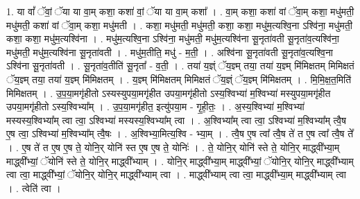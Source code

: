 \documentclass[17pt]{extarticle}
\begin{document}
1. या वां᳚ ॅवां॒ ॅया या वा॒म् कशा॒ कशा॑ वां॒ ॅया या वा॒म् कशा᳚ । . वा॒म् कशा॒ कशा॑ वां ॅवा॒म् कशा॒ मधु॑मती॒ मधु॑मती॒ कशा॑ वां ॅवा॒म् कशा॒ मधु॑मती । . कशा॒ मधु॑मती॒ मधु॑मती॒ कशा॒ कशा॒ मधु॑म॒त्यश्वि॒ना ऽश्वि॑ना॒ मधु॑मती॒ कशा॒ कशा॒ मधु॑म॒त्यश्वि॑ना । . मधु॑म॒त्यश्वि॒ना ऽश्वि॑ना॒ मधु॑मती॒ मधु॑म॒त्यश्वि॑ना सू॒नृता॑वती सू॒नृता॑व॒त्यश्वि॑ना॒ मधु॑मती॒ मधु॑म॒त्यश्वि॑ना सू॒नृता॑वती । . मधु॑म॒तीति॒ मधु॑ - म॒ती॒ । . अश्वि॑ना सू॒नृता॑वती सू॒नृता॑व॒त्यश्वि॒ना ऽश्वि॑ना सू॒नृता॑वती । . सू॒नृता॑व॒तीति॑ सू॒नृता᳚ - व॒ती॒ । . तया॑ य॒ज्ञ्ं ॅय॒ज्ञ्म् तया॒ तया॑ य॒ज्ञ्म् मि॑मिक्षतम् मिमिक्षतं ॅय॒ज्ञ्म् तया॒ तया॑ य॒ज्ञ्म् मि॑मिक्षतम् । . य॒ज्ञ्म् मि॑मिक्षतम् मिमिक्षतं ॅय॒ज्ञ्ं ॅय॒ज्ञ्म् मि॑मिक्षतम् । . मि॒मि॒क्ष॒त॒मिति॑ मिमिक्षतम् । . उ॒प॒या॒मगृ॑हीतो ऽस्यस्युपया॒मगृ॑हीत उपया॒मगृ॑हीतो ऽस्य॒श्विभ्या॑ म॒श्विभ्या॑ मस्युपया॒मगृ॑हीत उपया॒मगृ॑हीतो ऽस्य॒श्विभ्या᳚म् । . उ॒प॒या॒मगृ॑हीत॒ इत्यु॑पया॒म - गृ॒ही॒तः॒ । . अ॒स्य॒श्विभ्या॑ म॒श्विभ्या॑ मस्यस्य॒श्विभ्या᳚म् त्वा त्वा॒ ऽश्विभ्या॑ मस्यस्य॒श्विभ्या᳚म् त्वा । . अ॒श्विभ्या᳚म् त्वा त्वा॒ ऽश्विभ्या॑ म॒श्विभ्या᳚म् त्वै॒ष ए॒ष त्वा॒ ऽश्विभ्या॑ म॒श्विभ्या᳚म् त्वै॒षः । . अ॒श्विभ्या॒मित्य॒श्वि - भ्या॒म् । . त्वै॒ष ए॒ष त्वा᳚ त्वै॒ष ते॑ त ए॒ष त्वा᳚ त्वै॒ष ते᳚ । . ए॒ष ते॑ त ए॒ष ए॒ष ते॒ योनि॒र् योनि॑ स्त ए॒ष ए॒ष ते॒ योनिः॑ । . ते॒ योनि॒र् योनि॑ स्ते ते॒ योनि॒र् माद्ध्वी᳚भ्या॒म् माद्ध्वी᳚भ्यां॒ ॅयोनि॑ स्ते ते॒ योनि॒र् माद्ध्वी᳚भ्याम् । . योनि॒र् माद्ध्वी᳚भ्या॒म् माद्ध्वी᳚भ्यां॒ ॅयोनि॒र् योनि॒र् माद्ध्वी᳚भ्याम् त्वा त्वा॒ माद्ध्वी᳚भ्यां॒ ॅयोनि॒र् योनि॒र् माद्ध्वी᳚भ्याम् त्वा । . माद्ध्वी᳚भ्याम् त्वा त्वा॒ माद्ध्वी᳚भ्या॒म् माद्ध्वी᳚भ्याम् त्वा । . त्वेति॑ त्वा । \newline
\pagebreak
{}
\end{document}
